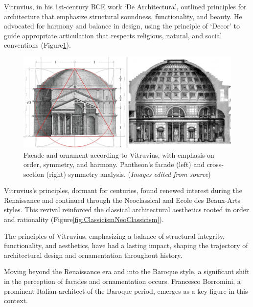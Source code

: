 
Vitruvius, in his 1st-century BCE work `De Architectura', outlined principles for architecture that emphasize structural soundness, functionality, and beauty\cite{Ostwald2023}.
He advocated for harmony and balance in design, using the principle of `Decor' to guide appropriate articulation that respects religious, natural, and social conventions\cite{Lefas2000} (Figure\ref{fig:Vitruvianarchitecture}).

    \begin{figure}[htb]
    \centering
    \includegraphics[width= \linewidth]{Images/VitruvianArchitecture}
    \caption{Facade and ornament according to Vitruvius, with emphasis on order, symmetry, and harmony. Pantheon's facade (left) and cross-section (right) symmetry analysis. (\textit{Images edited from source})}
    \label{fig:Vitruvianarchitecture}
    \end{figure}

Vitruvius's principles, dormant for centuries, found renewed interest during the Renaissance and continued through the Neoclassical and Ecole des Beaux-Arts styles\cite{Wikipedia2023}.
This revival reinforced the classical architectural aesthetics rooted in order and rationality (Figure\ref{fig:ClassicismNeoClassicism}).

The principles of Vitruvius, emphasizing a balance of structural integrity, functionality, and aesthetics, have had a lasting impact, shaping the trajectory of architectural design and ornamentation throughout history.


Moving beyond the Renaissance era and into the Baroque style, a significant shift in the perception of facades and ornamentation occurs.
Francesco Borromini, a prominent Italian architect of the Baroque period, emerges as a key figure in this context.

